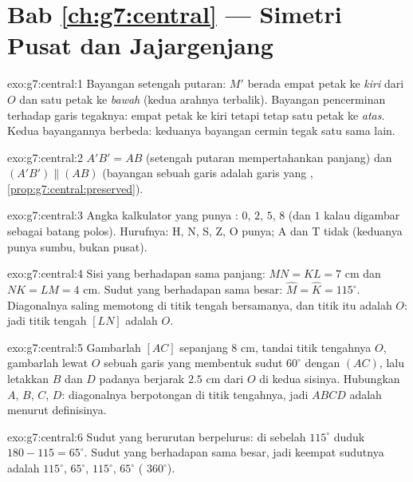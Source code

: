 \section*{Bab \ref{ch:g7:central} --- Simetri Pusat dan Jajargenjang}

\begin{solution}{exo:g7:central:1}
Bayangan setengah putaran: $M'$ berada empat petak ke \emph{kiri} dari
$O$ dan satu petak ke \emph{bawah} (kedua arahnya terbalik). Bayangan
pencerminan terhadap garis tegaknya: empat petak ke kiri tetapi tetap
satu petak ke \emph{atas}. Kedua bayangannya berbeda: keduanya
bayangan cermin tegak satu sama lain.
\end{solution}

\begin{solution}{exo:g7:central:2}
$A'B' = AB$ (setengah putaran mempertahankan panjang) dan
$(A'B') \parallel (AB)$ (bayangan sebuah garis adalah garis yang
, \cref{prop:g7:central:preserved}).
\end{solution}

\begin{solution}{exo:g7:central:3}
Angka kalkulator yang punya : $0$, $2$, $5$, $8$ (dan
$1$ kalau digambar sebagai batang polos). Hurufnya: H, N, S, Z, O
punya; A dan T tidak (keduanya punya sumbu, bukan pusat).
\end{solution}

\begin{solution}{exo:g7:central:4}
Sisi yang berhadapan sama panjang: $MN = KL = 7$ cm dan
$NK = LM = 4$ cm. Sudut yang berhadapan sama besar:
$\widehat M = \widehat K = 115^\circ$. Diagonalnya saling memotong di
titik tengah bersamanya, dan titik itu adalah $O$: jadi titik tengah
$[LN]$ adalah $O$.
\end{solution}

\begin{solution}{exo:g7:central:5}
Gambarlah  $[AC]$ sepanjang $8$ cm, tandai titik tengahnya
$O$, gambarlah lewat $O$ sebuah garis yang membentuk sudut $60^\circ$
dengan $(AC)$, lalu letakkan $B$ dan $D$ padanya berjarak $2.5$ cm
dari $O$ di kedua sisinya. Hubungkan $A$, $B$, $C$, $D$: diagonalnya
berpotongan di titik tengahnya, jadi $ABCD$ adalah 
menurut definisinya.
\end{solution}

\begin{solution}{exo:g7:central:6}
Sudut yang berurutan berpelurus: di sebelah $115^\circ$ duduk
$180 - 115 = 65^\circ$. Sudut yang berhadapan sama besar, jadi keempat
sudutnya adalah $115^\circ$, $65^\circ$, $115^\circ$, $65^\circ$
( $360^\circ$).
\end{solution}

